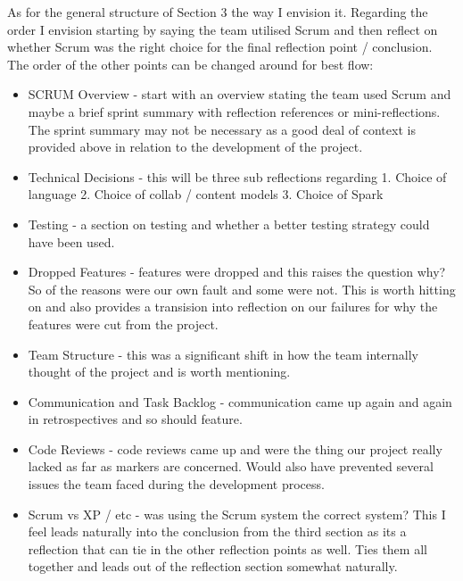 \documentclass{l3proj}
\begin{document}

As for the general structure of Section 3 the way I envision it. Regarding the order I envision starting by saying the team utilised Scrum and then reflect on whether Scrum was the right choice for the final reflection point / conclusion. The order of the other points can be changed around for best flow:
\begin{itemize}
\item SCRUM Overview - start with an overview stating the team used Scrum and maybe a brief sprint summary with reflection references or mini-reflections. The sprint summary may not be necessary as a good deal of context is provided above in relation to the development of the project.
\item Technical Decisions - this will be three sub reflections regarding 1. Choice of language 2. Choice of collab / content models 3. Choice of Spark
\item Testing - a section on testing and whether a better testing strategy could have been used.
\item Dropped Features - features were dropped and this raises the question why? So of the reasons were our own fault and some were not. This is worth hitting on and also provides a transision into reflection on our failures for why the features were cut from the project.
\item Team Structure - this was a significant shift in how the team internally thought of the project and is worth mentioning.
\item Communication and Task Backlog - communication came up again and again in retrospectives and so should feature.
\item Code Reviews - code reviews came up and were the thing our project really lacked as far as markers are concerned. Would also have prevented several issues the team faced during the development process.
\item Scrum vs XP / etc - was using the Scrum system the correct system? This I feel leads naturally into the conclusion from the third section as its a reflection that can tie in the other reflection points as well. Ties them all together and leads out of the reflection section somewhat naturally.
\end{itemize} 
\end{document}
